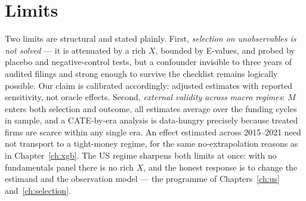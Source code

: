 \section{Limits}
\label{sec:causal-limits}

Two limits are structural and stated plainly. First, \emph{selection on unobservables
is not solved} --- it is attenuated by a rich $X$, bounded by E-values, and probed by
placebo and negative-control tests, but a confounder invisible to three years of
audited filings and strong enough to survive the checklist remains logically possible.
Our claim is calibrated accordingly: adjusted estimates with reported sensitivity, not
oracle effects. Second, \emph{external validity across macro regimes}: $M$ enters both
selection and outcome, all estimates average over the funding cycles in sample, and a
CATE-by-era analysis is data-hungry precisely because treated firms are scarce within
any single era. An effect estimated across 2015--2021 need not transport to a
tight-money regime, for the same no-extrapolation reasons as in
Chapter~\ref{ch:xgb}. The US regime sharpens both limits at once: with no fundamentals
panel there is no rich $X$, and the honest response is to change the estimand and the
observation model --- the programme of Chapters~\ref{ch:us} and~\ref{ch:selection}.
